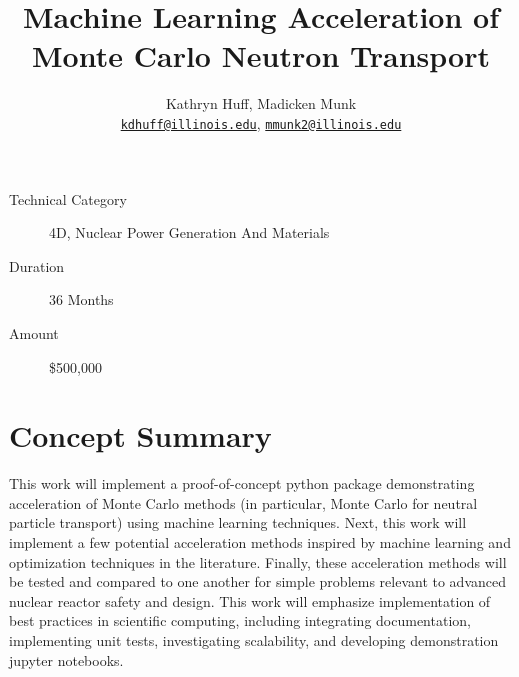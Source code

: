 \documentclass[letterpaper,12pt]{article}
\author{Kathryn Huff, Madicken Munk\\
        \href{mailto:kdhuff@illinois.edu}{\texttt{kdhuff@illinois.edu}},
        \href{mailto:mmunk2@illinois.edu}{\texttt{mmunk2@illinois.edu}}
}
\date{}
\title{Machine Learning Acceleration of Monte Carlo Neutron Transport}
\begin{document}
\maketitle

\thispagestyle{fancy}
\begin{center}
\begin{description}
    \item[Technical Category] 4D, Nuclear Power Generation And Materials
    \item[Duration] 36 Months
    \item[Amount] \$500,000
\end{description}
\end{center}

\section{Concept Summary}


This work will implement a proof-of-concept python package demonstrating
acceleration of Monte Carlo methods (in particular, Monte Carlo for neutral
particle transport) using machine learning techniques.
Next, this work will implement a few potential acceleration methods inspired by machine
learning and optimization techniques in the literature.
Finally, these acceleration methods will be tested and compared to one another for simple
problems relevant to advanced nuclear reactor safety and design.
This work will emphasize implementation of best practices in
scientific computing, including integrating documentation, implementing unit
tests, investigating scalability, and developing demonstration jupyter
notebooks.
\end{document}
